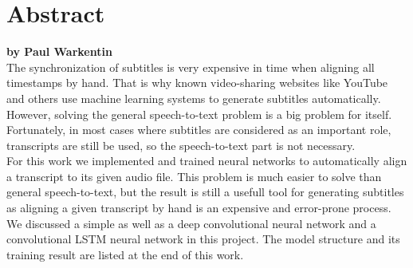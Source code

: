 \chapter*{Abstract}

\textbf{by Paul Warkentin} \\

The synchronization of subtitles is very expensive in time when aligning all timestamps by hand. That is why known video-sharing websites like YouTube and others use machine learning systems to generate subtitles automatically. However, solving the general speech-to-text problem is a big problem for itself. Fortunately, in most cases where subtitles are considered as an important role, transcripts are still be used, so the speech-to-text part is not necessary. \\

For this work we implemented and trained neural networks to automatically align a transcript to its given audio file. This problem is much easier to solve than general speech-to-text, but the result is still a usefull tool for generating subtitles as aligning a given transcript by hand is an expensive and error-prone process. \\

We discussed a simple as well as a deep convolutional neural network and a convolutional LSTM neural network in this project. The model structure and its training result are listed at the end of this work.
